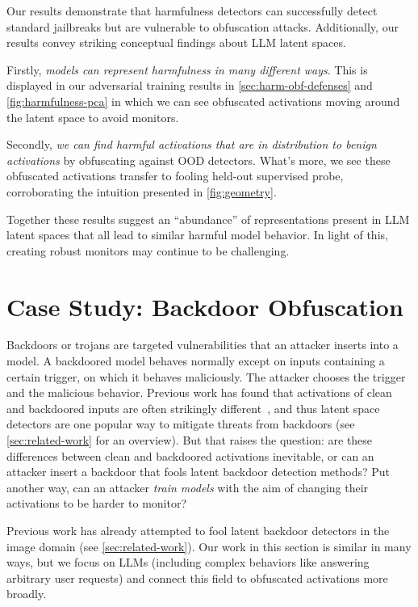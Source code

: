 \documentclass{article}
\begin{document}
Our results demonstrate that 
harmfulness detectors can successfully detect standard jailbreaks 
but are vulnerable to obfuscation attacks. Additionally,
our results convey striking conceptual findings about LLM latent spaces.

Firstly, \emph{models can represent harmfulness in many different ways}. 
This is displayed in our adversarial training results in 
\cref{sec:harm-obf-defenses} and \cref{fig:harmfulness-pca} 
in which we can see obfuscated activations moving around the latent 
space to avoid monitors.

Secondly, \emph{we can find harmful activations that are in 
distribution to benign activations} by obfuscating against 
OOD detectors. What's more, we see these obfuscated activations 
transfer to fooling held-out supervised probe, corroborating 
the intuition presented in \cref{fig:geometry}.

Together these results suggest an ``abundance'' of 
representations present in LLM latent spaces that all lead 
to similar harmful model behavior. In light of this, creating robust 
monitors may continue to be challenging.


\FloatBarrier
\section{Case Study: Backdoor Obfuscation}\label{sec:backdoors}

Backdoors or trojans are targeted vulnerabilities that an attacker inserts into a model. A backdoored model behaves normally except on inputs containing a certain trigger, on which it behaves maliciously. The attacker chooses the trigger and the malicious behavior.
Previous work has found that activations of clean and backdoored inputs are often strikingly different~\citep{tran2018spectral,qi2022circumventing}, and thus latent space detectors are one popular way to mitigate threats from backdoors (see \cref{sec:related-work} for an overview).
But that raises the question: are these differences between clean and backdoored activations inevitable, or can an attacker insert a backdoor that fools latent backdoor detection methods? 
Put another way, can an attacker \emph{train models} with the 
aim of changing their activations to be harder to monitor?

Previous work has already attempted to fool latent backdoor 
detectors in the image domain (see \cref{sec:related-work}).
Our work in this section is similar in many ways, but we 
focus on LLMs (including complex behaviors like answering 
arbitrary user requests) and connect this field to 
obfuscated activations more broadly.
\end{document}
